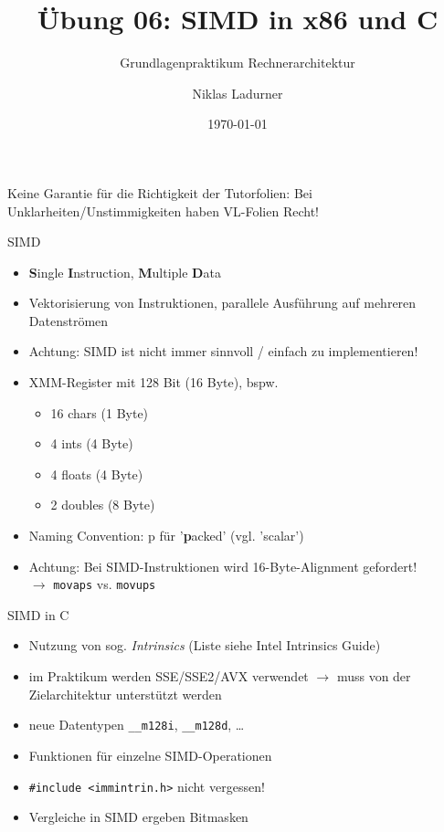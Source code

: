 \documentclass[
  german,            %
  aspectratio=169,    %
]{tumbeamer}
\title{Übung 06: SIMD in x86 und C}
\subtitle{Grundlagenpraktikum Rechnerarchitektur}
\author{Niklas Ladurner}
\institute{\theChairName\\\theDepartmentName\\\theUniversityName}
\date[\today]{\today}
\begin{document}
\maketitle

\begin{frame}[c]{}{}
  \begin{center}
    \LARGE  Keine Garantie für die Richtigkeit der Tutorfolien: Bei Unklarheiten/Unstimmigkeiten
    haben VL-Folien Recht!
  \end{center}
\end{frame}

\begin{frame}[c, fragile]{SIMD}{}
  \begin{itemize}
    \item \textbf{S}ingle \textbf{I}nstruction, \textbf{M}ultiple \textbf{D}ata
    \item Vektorisierung von Instruktionen, parallele Ausführung auf mehreren Datenströmen
    \item Achtung: SIMD ist nicht immer sinnvoll / einfach zu implementieren!
    \item XMM-Register mit 128 Bit (16 Byte), bspw.
    \begin{itemize}
      \item 16 chars (1 Byte)
      \item 4 ints (4 Byte)
      \item 4 floats (4 Byte)
      \item 2 doubles (8 Byte)
    \end{itemize}
    \item Naming Convention: p für '\textbf{p}acked' (vgl. 'scalar')
    \item Achtung: Bei SIMD-Instruktionen wird 16-Byte-Alignment gefordert! \\ $\rightarrow$ \verb|movaps| vs. \verb|movups|
  \end{itemize}
\end{frame}

\begin{frame}[c, fragile]{SIMD in C}{}
  \begin{itemize}
    \item Nutzung von sog. \textit{Intrinsics} (Liste siehe Intel Intrinsics Guide)
    \item im Praktikum werden SSE/SSE2/AVX verwendet $\rightarrow$ muss von der Zielarchitektur unterstützt werden
    \item neue Datentypen \verb|__m128i|, \verb|__m128d|, \ldots
    \item Funktionen für einzelne SIMD-Operationen
    \item \verb|#include <immintrin.h>| nicht vergessen!
    \item Vergleiche in SIMD ergeben Bitmasken
  \end{itemize}
\end{frame}
\end{document}
